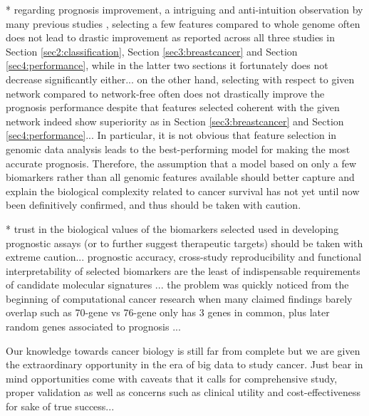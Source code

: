 * regarding prognosis improvement, a intriguing and anti-intuition observation by many previous studies \cite{Haury2011influence}, selecting a few features compared to whole genome often does not lead to drastic improvement as reported across all three studies in Section \ref{sec2:classification}, Section \ref{sec3:breastcancer} and Section \ref{sec4:performance}, while in the latter two sections it fortunately does not decrease significantly either... on the other hand, selecting with respect to given network compared to network-free often does not drastically improve the prognosis performance despite that features selected coherent with the given network indeed show superiority as in Section \ref{sec3:breastcancer} and Section \ref{sec4:performance}... In particular, it is not obvious that feature selection in genomic data analysis leads to the best-performing model for making the most accurate prognosis. Therefore, the assumption that a model based on only a few biomarkers rather than all genomic features available should better capture and explain the biological complexity related to cancer survival has not yet until now been definitively confirmed, and thus should be taken with caution.


* trust in the biological values of the biomarkers selected used in developing prognostic assays (or to further suggest therapeutic targets) should be taken with extreme caution... prognostic accuracy, cross-study reproducibility and functional interpretability of selected biomarkers are the least of indispensable requirements of candidate molecular signatures \cite{Haury2011influence}... the problem was quickly noticed from the beginning of computational cancer research when many claimed findings barely overlap such as 70-gene vs 76-gene only has 3 genes in common, plus later random genes associated to prognosis \cite{Venet2011Most}...


Our knowledge towards cancer biology is still far from complete but we are given the extraordinary opportunity in the era of big data to study cancer. Just bear in mind opportunities come with caveats that it calls for comprehensive study, proper validation as well as concerns such as clinical utility and cost-effectiveness for sake of true success...
